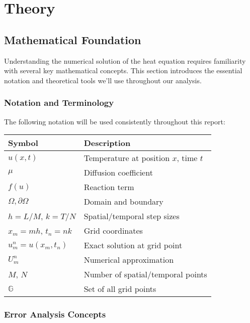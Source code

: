 \section{Theory}

\subsection{Mathematical Foundation}

Understanding the numerical solution of the heat equation requires familiarity with several key mathematical concepts.
This section introduces the essential notation and theoretical tools we'll use throughout our analysis.

\subsubsection{Notation and Terminology}
The following notation will be used consistently throughout this report:

\begin{table}[h]
  \centering
  \begin{tabular}{@{}ll@{}}
    \textbf{Symbol}          & \textbf{Description}                  \\
    \hline
    $u(x,t)$                 & Temperature at position $x$, time $t$ \\
    $\mu$                    & Diffusion coefficient                 \\
    $f(u)$                   & Reaction term                         \\
    $\Omega, \partial\Omega$ & Domain and boundary                   \\
    \hline
    $h=L/M$, $k=T/N$         & Spatial/temporal step sizes           \\
    $x_m=mh$, $t_n=nk$       & Grid coordinates                      \\
    $u_m^n=u(x_m,t_n)$       & Exact solution at grid point          \\
    $U_m^n$                  & Numerical approximation               \\
    $M$, $N$                 & Number of spatial/temporal points     \\
    $\mathbb{G}$             & Set of all grid points                \\
  \end{tabular}
\end{table}

\subsubsection{Error Analysis Concepts}


